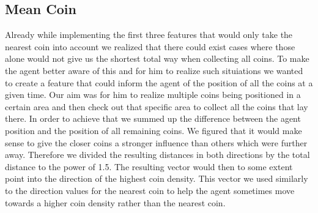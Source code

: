 \subsection{Mean Coin}
Already while implementing the first three features that would only take the nearest coin into account we realized that there could exist cases where those alone would not give us the shortest total way when collecting all coins. To make the agent better aware of this and for him to realize such situiations we wanted to create a feature that could inform the agent of the position of all the coins at a given time. Our aim was for him to realize multiple coins being positioned in a certain area and then check out that specific area to collect all the coins that lay there. In order to achieve that we summed up the difference between the agent position and the position of all remaining coins. We figured that it would make sense to give the closer coins a stronger influence than others which were further away. Therefore we divided the resulting distances in both directions by the total distance to the power of 1.5. The resulting vector would then to some extent point into the direction of the highest coin density. This vector we used similarly to the direction values for the nearest coin to help the agent sometimes move towards a higher coin density rather than the nearest coin.

